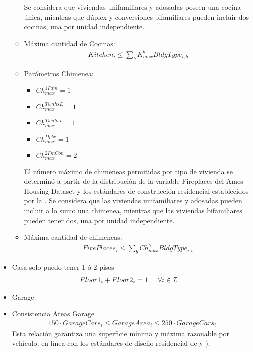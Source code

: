 \begin{itemize}
\begin{itemize}
    Se considera que viviendas unifamiliares y adosadas poseen una cocina única, mientras que dúplex y conversiones bifamiliares pueden incluir dos cocinas, una por unidad independiente.
    \item {Máxima cantidad de Cocinas:}
    \begin{align}
        Kitchen_{i}\leq \sum _{b} K_{max}^{b} BldgType_{i,b}
    \end{align}
        \item Parámetros Chimenea:
        \begin{itemize}
            \item $Ch_{max}^{1Fam}=1$\\
            \item $Ch_{max}^{TwnhsE}=1$\\
            \item $Ch_{max}^{TwnhsI}=1$\\
            \item $Ch_{max}^{Dplx}=1$\\
            \item $Ch_{max}^{2FmCon}=2$ 
    \end{itemize}
    El número máximo de chimeneas permitidas por tipo de vivienda se determinó a partir de la distribución de la variable Fireplaces del Ames Housing Dataset \cite{decock2011} y los estándares de construcción residencial establecidos por la \cite{NAHB2023}.
Se considera que las viviendas unifamiliares y adosadas pueden incluir a lo sumo una chimenea, mientras que las viviendas bifamiliares pueden tener dos, una por unidad independiente.
    \item{Máxima cantidad de chimeneas:}
    \begin{align}
        FirePlaces_{i} \leq \sum_{b} Ch_{max}^{b} BldgType_{i,b}
    \end{align}
\end{itemize}
    \item{Casa solo puedo tener 1 ó 2 pisos}
\begin{align}
    &Floor1_{i} +Floor2_{i}=1 \hspace{5mm} \forall i \in \mathcal{I}
\end{align}
    \item{Garage}
    \item {Consistencia Areas Garage}
\begin{align}
    150\cdot GarageCars_{i} \leq GarageArea_{i}\leq 250 \cdot GarageCars_{i}
\end{align}
    Esta relación garantiza una superficie mínima y máxima razonable por vehículo, en línea con los estándares de diseño residencial de \cite{NAHB2023} y \cite{ICC2021}).

\end{itemize}
